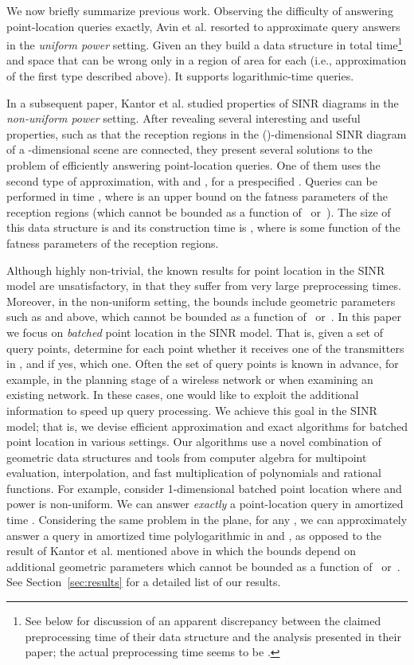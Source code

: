 \documentclass[11pt]{article}
\theoremstyle{remark}
\begin{document}
We now briefly summarize previous work. Observing the difficulty of answering point-location queries exactly, Avin et al. \cite{aeklpr-sdciawn-12} resorted to approximate query answers in the \emph{uniform power} setting.  Given an  they build a data structure in total time\footnote{See below for discussion of an apparent discrepancy between the claimed preprocessing time of their data structure and the analysis presented in their paper; the actual preprocessing time seems to be .}
 and space  that can be wrong only in a region of area  for each  (i.e., approximation of the first type described above).  It supports logarithmic-time queries.

In a subsequent paper, Kantor et al. \cite{klpp-twn-11} studied properties of SINR diagrams in the \emph{non-uniform power} setting. After revealing several interesting and useful properties, such as that the reception regions in the ()-dimensional SINR diagram of a -dimensional scene are connected, they present several solutions to the problem of efficiently answering point-location queries.  One of them uses the second type of approximation, with  and , for a prespecified .  Queries can be performed in time , where  is an upper bound on the fatness parameters of the reception regions (which cannot be bounded as a function of~ or~). The size of this data structure is  and its construction time is , where  is some function of the fatness parameters of the reception regions.


Although highly non-trivial, the known results for point location in the SINR model are unsatisfactory, in that they suffer from very large preprocessing times. Moreover, in the non-uniform setting, the bounds include geometric parameters such as  and  above, which cannot be bounded as a function of~ or~.
In this paper we focus on \emph{batched} point location in the SINR  model. 
That is, given a set  of  query points, determine for each point  whether it receives one of the transmitters in ,
and if yes, which one. Often the set of query points is known in advance, for example, 
in the planning stage of a wireless network or when examining an existing network.  In these cases, one would like to exploit the additional information to speed up query processing.  We achieve this goal in the SINR model; that is, we devise efficient approximation and exact algorithms for batched point location in various settings. Our algorithms use a novel combination of 
geometric data structures and tools from computer algebra for multipoint evaluation, interpolation, and fast multiplication of polynomials and rational functions.
For example, consider 1-dimensional batched point location where  and power is non-uniform. We can answer \emph{exactly} a point-location query in amortized time .  Considering the same problem in the plane, for any , we can approximately answer a query in amortized time polylogarithmic in  and , as opposed to the result of Kantor et al. \cite{klpp-twn-11} mentioned above in which the bounds depend on additional geometric parameters which cannot be bounded as a function of~ or~.  See Section~\ref{sec:results} for a detailed list of our results.
\end{document}
